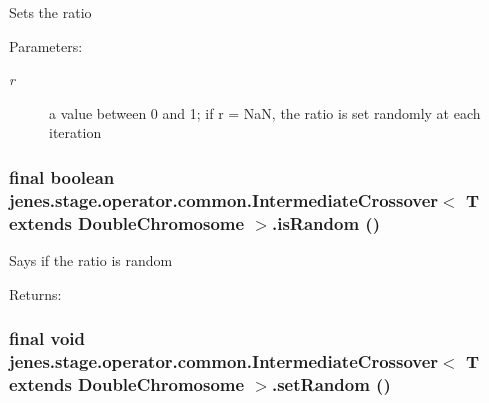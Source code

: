 Sets the ratio \begin{Desc}
\item[Parameters:]
\begin{description}
\item[{\em r}]a value between 0 and 1; if r = NaN, the ratio is set randomly at each iteration \end{description}
\end{Desc}
\hypertarget{classjenes_1_1stage_1_1operator_1_1common_1_1_intermediate_crossover_3_01_t_01extends_01_double_chromosome_01_4_aed91a2488a595ef3033be9b87f7a6d1}{
\subsubsection[isRandom]{\setlength{\rightskip}{0pt plus 5cm}final boolean jenes.stage.operator.common.IntermediateCrossover$<$ T extends {\bf DoubleChromosome} $>$.isRandom ()}}
\label{classjenes_1_1stage_1_1operator_1_1common_1_1_intermediate_crossover_3_01_t_01extends_01_double_chromosome_01_4_aed91a2488a595ef3033be9b87f7a6d1}


Says if the ratio is random \begin{Desc}
\item[Returns:]\end{Desc}
\hypertarget{classjenes_1_1stage_1_1operator_1_1common_1_1_intermediate_crossover_3_01_t_01extends_01_double_chromosome_01_4_7e3eb40cb2a7db9c3a80c98547cce253}{
\subsubsection[setRandom]{\setlength{\rightskip}{0pt plus 5cm}final void jenes.stage.operator.common.IntermediateCrossover$<$ T extends {\bf DoubleChromosome} $>$.setRandom ()}}
\label{classjenes_1_1stage_1_1operator_1_1common_1_1_intermediate_crossover_3_01_t_01extends_01_double_chromosome_01_4_7e3eb40cb2a7db9c3a80c98547cce253}


